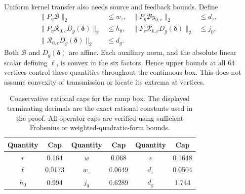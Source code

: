 Uniform kernel transfer also needs source and feedback bounds. Define
\begin{align}
 \|P_\eta\mathcal B\|_2&\le w_z,&
 \|P_\eta\mathcal B y_{0,c}\|_2&\le d_z,\nonumber\\
 \|P_\eta\mathcal R_{0,c}D_g(\bm\delta)\|_2&\le h_0,&
 \|F_c\mathcal R_{0,c}D_g(\bm\delta)\|_2&\le j_0,\nonumber\\
 \|\mathcal R_{0,c}D_g(\bm\delta)\|_2&\le d_g.
 \label{eq:sm-ramp-affine-transfer-caps}
\end{align}
Both $\mathcal B$ and $D_g(\bm\delta)$ are affine. Each auxiliary norm, and the absolute linear scalar defining $\ell$, is convex in the six factors. Hence upper bounds at all 64 vertices control these quantities throughout the continuous box. This does not assume convexity of transmission or locate its extrema at vertices.

\begin{table}[!htbp]
 \centering
 \caption{Conservative rational caps for the ramp box. The displayed terminating decimals are the exact rational constants used in the proof. All operator caps are verified using sufficient Frobenius or weighted-quadratic-form bounds.}
 \label{tab:sm-ramp-box-caps}
 \begin{tabular}{cccccc}
  \toprule
  Quantity & Cap & Quantity & Cap & Quantity & Cap\\
  \midrule
  $r$ & 0.164 & $w$ & 0.068 & $v$ & 0.1648\\
  $\ell$ & 0.0173 & $w_z$ & 0.0649 & $d_z$ & 0.0504\\
  $h_0$ & 0.994 & $j_0$ & 0.6289 & $d_g$ & 1.744\\
  \bottomrule
 \end{tabular}
\end{table}

